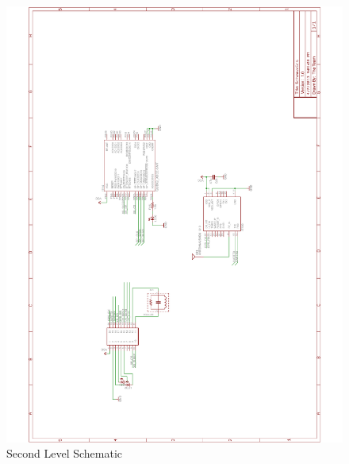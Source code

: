 \begin{figure}[H]
\centering
	\includegraphics[width=\textwidth]{img/SecondLevelSchematics}
	\caption{Second Level Schematic \label{fig:secondLevel}}
\end{figure}


